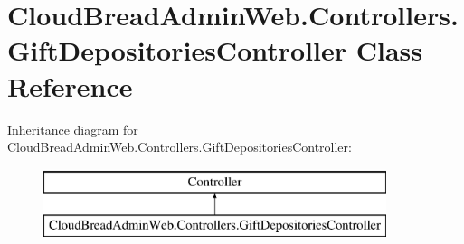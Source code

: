 \hypertarget{class_cloud_bread_admin_web_1_1_controllers_1_1_gift_depositories_controller}{}\section{Cloud\+Bread\+Admin\+Web.\+Controllers.\+Gift\+Depositories\+Controller Class Reference}
\label{class_cloud_bread_admin_web_1_1_controllers_1_1_gift_depositories_controller}
Inheritance diagram for Cloud\+Bread\+Admin\+Web.\+Controllers.\+Gift\+Depositories\+Controller\+:\begin{figure}[H]
\begin{center}
\leavevmode
\includegraphics[height=2.000000cm]{class_cloud_bread_admin_web_1_1_controllers_1_1_gift_depositories_controller}
\end{center}
\end{figure}
